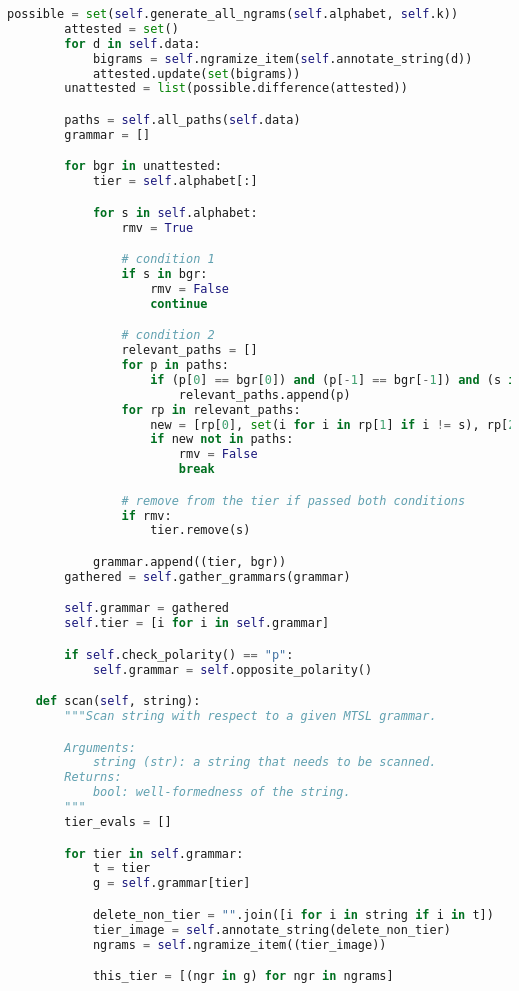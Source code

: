 \begin{lstlisting}[language=Python]
        possible = set(self.generate_all_ngrams(self.alphabet, self.k))
        attested = set()
        for d in self.data:
            bigrams = self.ngramize_item(self.annotate_string(d))
            attested.update(set(bigrams))
        unattested = list(possible.difference(attested))

        paths = self.all_paths(self.data)
        grammar = []

        for bgr in unattested:
            tier = self.alphabet[:]

            for s in self.alphabet:
                rmv = True

                # condition 1
                if s in bgr:
                    rmv = False
                    continue

                # condition 2
                relevant_paths = []
                for p in paths:
                    if (p[0] == bgr[0]) and (p[-1] == bgr[-1]) and (s in p[1]):
                        relevant_paths.append(p)
                for rp in relevant_paths:
                    new = [rp[0], set(i for i in rp[1] if i != s), rp[2]]
                    if new not in paths:
                        rmv = False
                        break

                # remove from the tier if passed both conditions
                if rmv:
                    tier.remove(s)

            grammar.append((tier, bgr))
        gathered = self.gather_grammars(grammar)

        self.grammar = gathered
        self.tier = [i for i in self.grammar]

        if self.check_polarity() == "p":
            self.grammar = self.opposite_polarity()

    def scan(self, string):
        """Scan string with respect to a given MTSL grammar.

        Arguments:
            string (str): a string that needs to be scanned.
        Returns:
            bool: well-formedness of the string.
        """
        tier_evals = []

        for tier in self.grammar:
            t = tier
            g = self.grammar[tier]

            delete_non_tier = "".join([i for i in string if i in t])
            tier_image = self.annotate_string(delete_non_tier)
            ngrams = self.ngramize_item((tier_image))

            this_tier = [(ngr in g) for ngr in ngrams]


\end{lstlisting}
